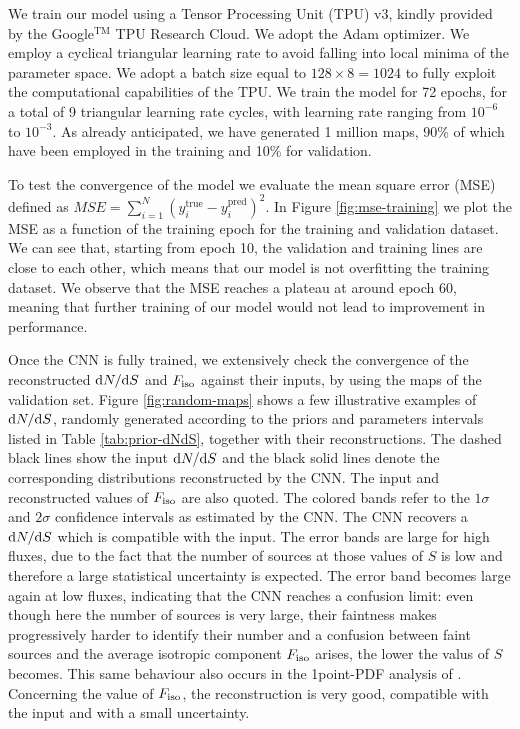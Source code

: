We train our model using a Tensor Processing Unit (TPU) v3, kindly provided by the Google$^\textrm{TM}$ TPU Research Cloud. We adopt the Adam optimizer. We employ a cyclical triangular learning rate \cite{triangular} to avoid falling into local minima of the parameter space. We adopt a batch size equal to $128\times 8=1024$ to fully exploit the computational capabilities of the TPU. We train the model for 72 epochs, for a total of 9 triangular learning rate cycles, with learning rate ranging from $10^{-6}$ to $10^{-3}$. 
As already anticipated, we have generated 1 million maps, 90\% of which have been employed in the training and 10\% for validation.

To test the convergence of the model we evaluate the mean square error (MSE)  defined as $MSE=\sum_{i=1}^N (y_i^\textrm{true}-y_i^\textrm{pred})^2$. 
In Figure \ref{fig:mse-training} we plot the MSE as a function of the training epoch for the training and validation dataset. We can see that, starting from epoch 10, the validation and training lines are close to each other, which means that our model is not overfitting the training dataset. We observe that the MSE reaches a plateau at around epoch 60, meaning that further training of our model would not lead to  improvement in performance.

Once the CNN is fully trained, we extensively check the convergence of the reconstructed $\text{d}N/\text{d}S$ and $F_{\text{iso}}$ against their inputs, by using the maps of the validation set. 
Figure \ref{fig:random-maps} shows a few illustrative examples of $\text{d}N/\text{d}S$, randomly generated according to the priors and parameters intervals listed in Table \ref{tab:prior-dNdS}, together with their reconstructions. 
The dashed black lines show the input $\text{d}N/\text{d}S$ and the black solid lines denote the corresponding distributions reconstructed by the CNN. The  input and reconstructed values of $F_{\text{iso}}$ are also quoted. The colored bands refer to the $1\sigma$ and $2\sigma$ confidence intervals
as estimated by the CNN.
The CNN recovers a $\text{d}N/\text{d}S$ which is compatible with the input. The error bands are large for high fluxes, due to the fact that the number of sources at those values of $S$ is low and therefore a large statistical uncertainty is expected. The error band becomes large again at low fluxes, indicating that the CNN reaches a confusion limit: even though here the number of sources is very large, their faintness makes progressively harder to identify their number and a confusion between faint sources and the average isotropic component $F_{\text{iso}}$ arises, the lower the valus of $S$ becomes. This same behaviour also occurs in the 1point-PDF analysis of \cite{Cuoco-1pdf}. Concerning the value of $F_{\text{iso}}$, the reconstruction is very good, compatible with the input and with a small uncertainty. 



